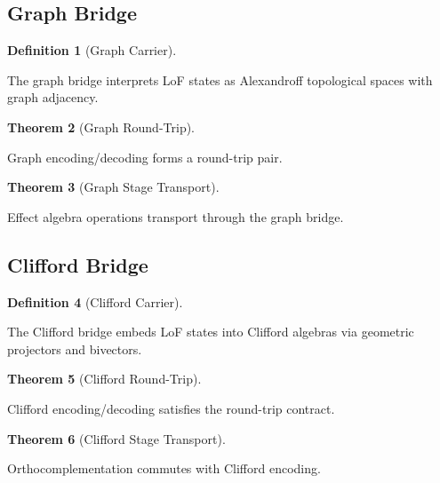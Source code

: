 \documentclass{amsart}
\theoremstyle{definition}
\newtheorem{definition}{Definition}[section]
\newtheorem{theorem}[definition]{Theorem}
\theoremstyle{remark}
\begin{document}
\subsection{Graph Bridge}
\label{sec:graph-bridge}

\begin{definition}[Graph Carrier]
\label{def:graph-carrier}
\uses{}

The graph bridge interprets LoF states as Alexandroff topological spaces with graph adjacency.
\end{definition}

\begin{theorem}[Graph Round-Trip]
\label{thm:graph-rt}
\leanok
{}

Graph encoding/decoding forms a round-trip pair.
\end{theorem}

\begin{theorem}[Graph Stage Transport]
\label{thm:graph-stage}
\leanok
{}

Effect algebra operations transport through the graph bridge.
\end{theorem}

\subsection{Clifford Bridge}
\label{sec:clifford-bridge}

\begin{definition}[Clifford Carrier]
\label{def:clifford-carrier}
\uses{}

The Clifford bridge embeds LoF states into Clifford algebras via geometric projectors and bivectors.
\end{definition}

\begin{theorem}[Clifford Round-Trip]
\label{thm:clifford-rt}
\leanok
{}

Clifford encoding/decoding satisfies the round-trip contract.
\end{theorem}

\begin{theorem}[Clifford Stage Transport]
\label{thm:clifford-stage}
\leanok
{}

Orthocomplementation commutes with Clifford encoding.
\end{theorem}
\end{document}
